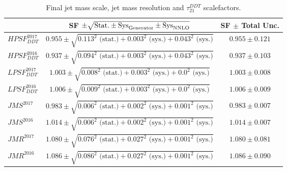  \begin{table}[htbp]
    \centering
     \begin{tabular}{|l|c|c|}
     \hline
      & SF $\pm \sqrt{\textrm{Stat.} \pm \textrm{Sys}_{\rm{Generator}} \pm \textrm{Sys}_{\rm{NNLO}}}$ & SF $\pm$ Total Unc. \\
    \hline
    $HPSF_{DDT}^{2017}$ &  $0.955 \pm \sqrt{0.113^2 \textrm{ (stat.)} + 0.003^2 \textrm{ (sys.)} + 0.043^2 \textrm{ (sys.)}}$  & $0.955 \pm 0.121$\\
    $HPSF_{DDT}^{2016}$ &  $0.937 \pm \sqrt{0.094^2 \textrm{ (stat.)} + 0.003^2 \textrm{ (sys.)} + 0.043^2 \textrm{ (sys.)}}$  & $0.937 \pm 0.103$\\
  \hline
    $LPSF_{DDT}^{2017}$ &  $1.003 \pm \sqrt{0.008^2 \textrm{ (stat.)} + 0.003^2 \textrm{ (sys.)} + 0.0^2 \textrm{ (sys.)}}$  & $1.003 \pm 0.008$\\
    $LPSF_{DDT}^{2016}$ &  $1.006 \pm \sqrt{0.009^2 \textrm{ (stat.)} + 0.003^2 \textrm{ (sys.)} + 0.0^2 \textrm{ (sys.)}}$  & $1.006 \pm 0.009$\\
     \hline
    $JMS^{2017}     $ &  $0.983 \pm \sqrt{0.006^2 \textrm{ (stat.)} + 0.002^2 \textrm{ (sys.)} + 0.001^2 \textrm{ (sys.)}}$ & $0.983 \pm 0.007$\\
    $JMS^{2016}     $ &  $1.014 \pm \sqrt{0.006^2 \textrm{ (stat.)} + 0.002^2 \textrm{ (sys.)} + 0.001^2 \textrm{ (sys.)}}$ & $1.014 \pm 0.007$\\
    \hline
    $JMR^{2017}     $ &  $1.080 \pm \sqrt{0.076^2 \textrm{ (stat.)} + 0.027^2 \textrm{ (sys.)} + 0.001^2 \textrm{ (sys.)}}$ & $1.080 \pm 0.081$\\
    $JMR^{2016}     $ &  $1.086 \pm \sqrt{0.086^2 \textrm{ (stat.)} + 0.027^2 \textrm{ (sys.)} + 0.001^2 \textrm{ (sys.)}}$ & $1.086 \pm 0.090$\\
    \hline
    \end{tabular}
       \caption{Final jet mass scale, jet mass resolution and $\tau_{21}^{DDT}$ scalefactors.}
       \label{tab:wsf_total}
    \end{table}


